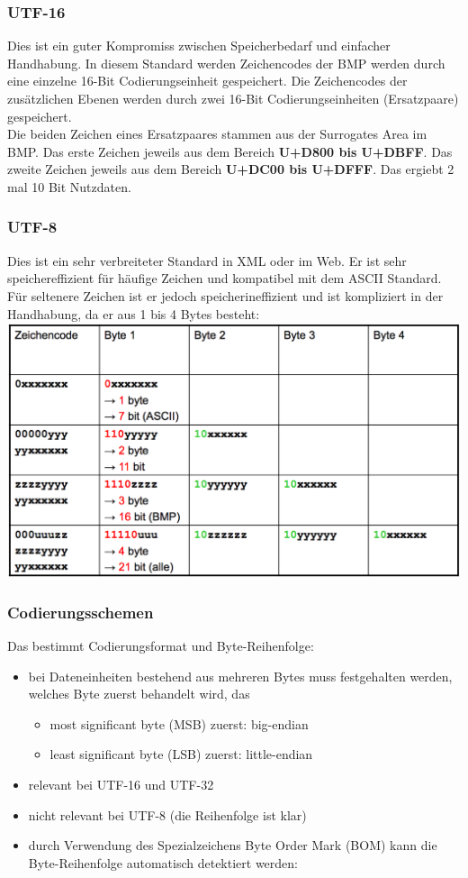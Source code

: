 \documentclass[a4paper,10pt]{article}
\newcommand{\Bold}[1]{\textbf{#1}} %
\begin{document}
\subsubsection{UTF-16}
Dies ist ein guter Kompromiss zwischen Speicherbedarf und einfacher Handhabung. In diesem Standard werden Zeichencodes der BMP werden durch eine einzelne 16-Bit Codierungseinheit gespeichert. Die Zeichencodes der zus\"atzlichen Ebenen werden durch zwei 16-Bit Codierungseinheiten (Ersatzpaare) gespeichert. \\
Die beiden Zeichen eines Ersatzpaares stammen aus der Surrogates Area im BMP. Das erste Zeichen jeweils aus dem Bereich \Bold {U+D800 bis U+DBFF}. Das zweite Zeichen jeweils aus dem Bereich \Bold {U+DC00 bis U+DFFF}. Das ergiebt 2 mal 10 Bit Nutzdaten.

\subsubsection{UTF-8}
Dies ist ein sehr verbreiteter Standard in XML oder im Web. Er ist sehr speichereffizient f\"ur h\"aufige Zeichen und kompatibel mit dem ASCII Standard. F\"ur seltenere Zeichen ist er jedoch speicherineffizient und ist kompliziert in der Handhabung, da er aus 1 bis 4 Bytes besteht: \\
\includegraphics[scale=0.35]{utf8.png}

\subsubsection{Codierungsschemen}
Das bestimmt Codierungsformat und Byte-Reihenfolge:
\begin{itemize}
	\item bei Dateneinheiten bestehend aus mehreren Bytes muss festgehalten werden, welches Byte zuerst behandelt wird, das
		\begin{itemize}
			\item most significant byte (MSB) zuerst: big-endian
			\item least significant byte (LSB) zuerst: little-endian
 		\end{itemize}		 
 	\item relevant bei UTF-16 und UTF-32
 	\item nicht relevant bei UTF-8 (die Reihenfolge ist klar)
 	\item durch Verwendung des Spezialzeichens Byte Order Mark (BOM) kann die Byte-Reihenfolge automatisch detektiert werden:
\end{itemize}
\end{document}
